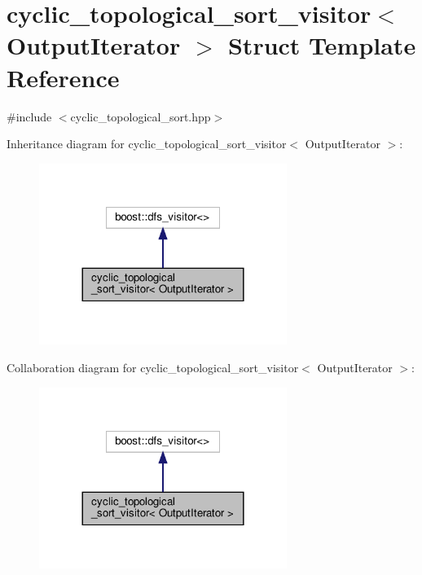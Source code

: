 \hypertarget{structcyclic__topological__sort__visitor}{}\section{cyclic\+\_\+topological\+\_\+sort\+\_\+visitor$<$ Output\+Iterator $>$ Struct Template Reference}
\label{structcyclic__topological__sort__visitor}


{\ttfamily \#include $<$cyclic\+\_\+topological\+\_\+sort.\+hpp$>$}



Inheritance diagram for cyclic\+\_\+topological\+\_\+sort\+\_\+visitor$<$ Output\+Iterator $>$\+:
\nopagebreak
\begin{figure}[H]
\begin{center}
\leavevmode
\includegraphics[width=228pt]{d5/d50/structcyclic__topological__sort__visitor__inherit__graph}
\end{center}
\end{figure}


Collaboration diagram for cyclic\+\_\+topological\+\_\+sort\+\_\+visitor$<$ Output\+Iterator $>$\+:
\nopagebreak
\begin{figure}[H]
\begin{center}
\leavevmode
\includegraphics[width=228pt]{db/d68/structcyclic__topological__sort__visitor__coll__graph}
\end{center}
\end{figure}

